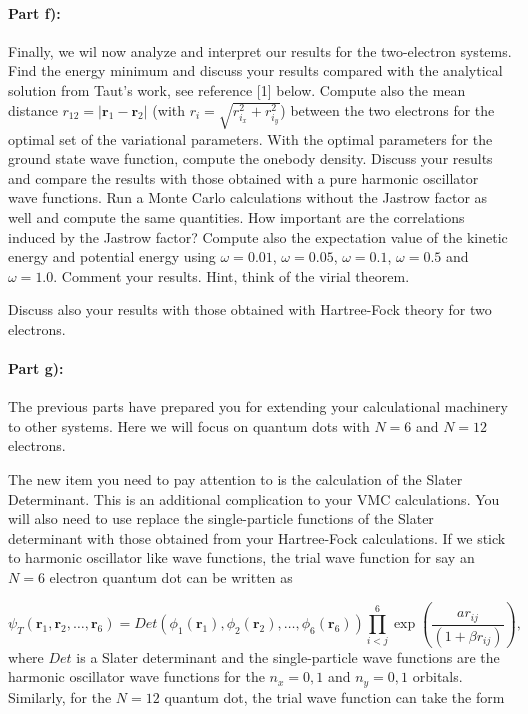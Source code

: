 \documentclass[oneside,final,a4wide,10pt]{article}
\begin{document}
\paragraph{Part  f):}
Finally, we wil now analyze and interpret our results for the two-electron systems.
Find the  energy minimum and discuss your results compared with the analytical solution from
Taut's work, see reference [1] below. Compute also the mean distance
$r_{12}=\vert \bm{r}_1-\bm{r}_2\vert$ (with $r_i = \sqrt{r_{i_x}^2+r_{i_y}^2}$) between the two electrons for the optimal set of the variational parameters.
With the optimal parameters for the ground state wave function, compute the onebody density. Discuss your results and compare the results with those obtained with a pure harmonic oscillator wave functions. Run a Monte Carlo calculations without the Jastrow factor as well
and compute the same quantities. How important are the correlations induced by the Jastrow factor?
Compute also the expectation value of the kinetic energy and potential energy using $\omega=0.01$, $\omega=0.05$,
$\omega=0.1$, $\omega=0.5$ and $\omega=1.0$. Comment your results. Hint, think of the virial theorem. 

Discuss also your results with those obtained with Hartree-Fock theory for two electrons. 

\paragraph{Part  g):}
The previous parts have prepared you for extending your calculational machinery  to other systems.
Here we will focus on quantum dots with $N=6$ and $N=12$ electrons.

The new item you need to pay attention to is the calculation of the Slater Determinant. This is an additional complication
to your VMC calculations.  You will also need to use replace the single-particle functions of the Slater determinant
with those obtained from your Hartree-Fock calculations.
If we stick to harmonic oscillator like wave functions,
the trial wave function for say an $N=6$ electron quantum dot can be written as

\begin{equation}
   \psi_{T}(\bm{r}_1,\bm{r}_2,\dots, \bm{r}_6) = 
   Det\left(\phi_{1}(\bm{r}_1),\phi_{2}(\bm{r}_2),
   \dots,\phi_{6}(\bm{r}_6)\right)
   \prod_{i<j}^{6}\exp{\left(\frac{a r_{ij}}{(1+\beta r_{ij})}\right)}, 
\end{equation}
where $Det$ is a Slater determinant and the single-particle wave functions
are the harmonic oscillator wave functions for the $n_x=0,1$ and $n_y=0,1$ orbitals. 
Similarly, for the $N=12$ quantum dot, the trial wave function can take the form
\end{document}
